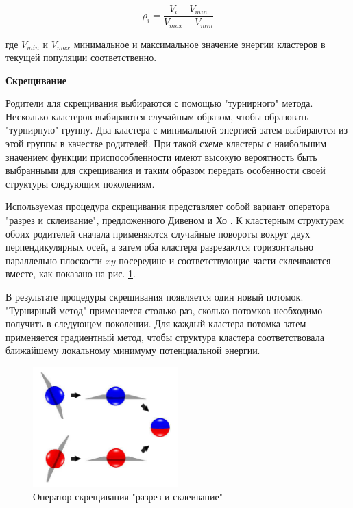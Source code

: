 \begin{equation}
  \rho_{i} = \frac{V_{i} - V_{min}}{V_{max}-V_{min}}
\end{equation}

где $V_{min}$ и $V_{max}$ минимальное и максимальное значение энергии кластеров в
текущей популяции соответственно.

{\bf Скрещивание}

Родители для скрещивания выбираются с помощью "турнирного" метода. Несколько кластеров
выбираются случайным образом, чтобы образовать "турнирную" группу. Два кластера с минимальной
энергией затем выбираются из этой группы в качестве родителей. При такой схеме кластеры
с наибольшим значением функции приспособленности имеют высокую вероятность быть выбранными
для скрещивания и таким образом передать особенности своей структуры следующим поколениям.

Используемая процедура скрещивания представляет собой вариант оператора "разрез и склеивание",
предложенного Дивеном и Хо \cite{Deaven1995}. К кластерным структурам обоих родителей сначала
применяются случайные повороты вокруг двух перпендикулярных осей, а затем оба кластера разрезаются
горизонтально параллельно плоскости $xy$ посередине и соответствующие части склеиваются вместе,
как показано на рис. \ref{cut_and_splice}.

В результате процедуры скрещивания появляется один новый потомок. "Турнирный метод" применяется
столько раз, сколько потомков необходимо получить в следующем поколении.
Для каждый кластера-потомка затем применяется градиентный метод, чтобы структура кластера
соответствовала ближайшему локальному минимуму потенциальной энергии.

\begin{figure}[h!]
\centering
  \includegraphics[width=0.5\textwidth]{./FIGs/cut_and_splice.png}
\caption{Оператор скрещивания "разрез и склеивание"}
\label{cut_and_splice}
\end{figure}

